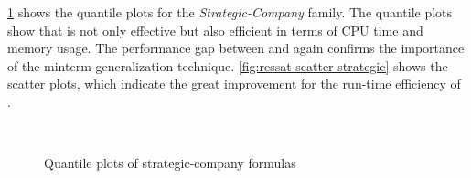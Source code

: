 \cref{fig:ressat-quantile-strategic} shows the quantile plots for the \textit{Strategic-Company} family.
The quantile plots show that \ressat is not only effective but also efficient
in terms of CPU time and memory usage.
The performance gap between \ressat and \ressatb again confirms the importance of the minterm-generalization technique.
\cref{fig:ressat-scatter-strategic} shows the scatter plots,
which indicate the great improvement for the run-time efficiency of \ressat.

\begin{figure}[hp]
    \centering
    \\
    \caption{Quantile plots of strategic-company formulas}
    \label{fig:ressat-quantile-strategic}
\end{figure}


